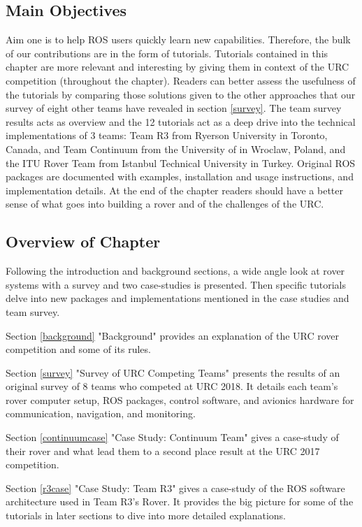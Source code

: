 \documentclass[runningheads,a4paper]{llncs}
\begin{document}
\subsection{Main Objectives}
Aim one is to help ROS users quickly learn new capabilities. Therefore, the bulk of our contributions are in the form of tutorials. Tutorials contained in this chapter are more relevant and interesting by giving them in context of the URC competition (throughout the chapter). Readers can better assess the usefulness of the tutorials by comparing those solutions given to the other approaches that our survey of eight other teams have revealed in section \ref{survey}. The team survey results acts as overview and the 12 tutorials act as a deep drive into the technical implementations of 3 teams: Team R3 from Ryerson University in Toronto, Canada, and Team Continuum from the University of in Wroclaw, Poland, and the ITU Rover Team from Istanbul Technical University in Turkey. Original ROS packages are documented with examples, installation and usage instructions, and implementation details. At the end of the chapter readers should have a better sense of what goes into building a rover and of the challenges of the URC. 

\subsection{Overview of Chapter}\label{Overview of Chapter}

Following the introduction and background sections, a wide angle look at rover systems with a survey and two case-studies is presented. Then specific tutorials delve into new packages and implementations mentioned in the case studies and team survey.

Section \ref{background} "Background" provides an explanation of the URC rover competition and some of its rules.

Section \ref{survey} "Survey of URC Competing Teams" presents the results of an original survey of 8 teams who competed at URC 2018. It details each team's rover computer setup, ROS packages, control software, and avionics hardware for communication, navigation, and monitoring.

Section \ref{continuumcase} "Case Study: Continuum Team" gives a case-study of their rover and what lead them to a second place result at the URC 2017 competition.

Section \ref{r3case} "Case Study: Team R3" gives a case-study of the ROS software architecture used in Team R3's Rover. It provides the big picture for some of the tutorials in later sections to dive into more detailed explanations.
\end{document}
